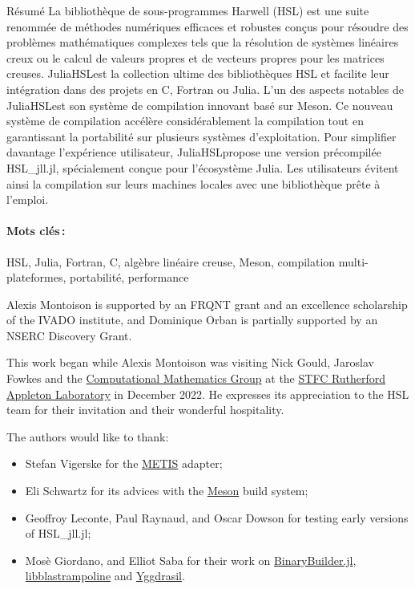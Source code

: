 \documentclass[gdweb]{geradwp}
\newcommand{\JuliaHSL}{JuliaHSL}  %
\newcommand{\HSLjll}{HSL\_jll.jl}
\begin{document}
\begin{GDabstract}{R\'esum\'e}
La bibliothèque de sous-programmes Harwell (HSL) est une suite renommée de méthodes numériques efficaces et robustes conçus pour résoudre des problèmes mathématiques complexes tels que la résolution de systèmes linéaires creux ou le calcul de valeurs propres et de vecteurs propres pour les matrices creuses.
\JuliaHSL est la collection ultime des bibliothèques HSL et facilite leur intégration dans des projets en C, Fortran ou Julia.
L'un des aspects notables de \JuliaHSL est son système de compilation innovant basé sur Meson.
Ce nouveau système de compilation accélère considérablement la compilation tout en garantissant la portabilité sur plusieurs systèmes d'exploitation.
Pour simplifier davantage l'expérience utilisateur, \JuliaHSL propose une version précompilée \HSLjll, spécialement conçue pour l'écosystème Julia.
Les utilisateurs évitent ainsi la compilation sur leurs machines locales avec une bibliothèque prête à l'emploi.

\paragraph{Mots cl\'es\,: }
HSL, Julia, Fortran, C, alg\`ebre lin\'eaire creuse, Meson, compilation multi-plateformes, portabilit\'e, performance
\end{GDabstract}

\begin{GDacknowledgements}
Alexis Montoison is supported by an FRQNT grant and an excellence scholarship of the IVADO institute, and Dominique Orban is partially supported by an NSERC Discovery Grant.

This work began while Alexis Montoison was visiting Nick Gould, Jaroslav Fowkes and the \href{https://www.numerical.rl.ac.uk/}{Computational Mathematics Group} at the \href{https://www.ukri.org/about-us/stfc/locations/rutherford-appleton-laboratory/}{STFC Rutherford Appleton Laboratory} in December 2022.
He expresses its appreciation to the HSL team for their invitation and their wonderful hospitality.

The authors would like to thank:
\begin{itemize}
  \item Stefan Vigerske for the \href{https://github.com/KarypisLab/METIS}{METIS} adapter;
  \item Eli Schwartz for its advices with the \href{https://mesonbuild.com/}{Meson} build system;
  \item Geoffroy Leconte, Paul Raynaud, and Oscar Dowson for testing early versions of \HSLjll;
  \item Mosè Giordano, and Elliot Saba for their work on \href{https://github.com/JuliaPackaging/BinaryBuilder.jl}{BinaryBuilder.jl}, \href{https://github.com/JuliaLinearAlgebra/libblastrampoline}{libblastrampoline} and \href{https://github.com/JuliaPackaging/Yggdrasil}{Yggdrasil}.
\end{itemize}
\end{GDacknowledgements}
\end{document}
